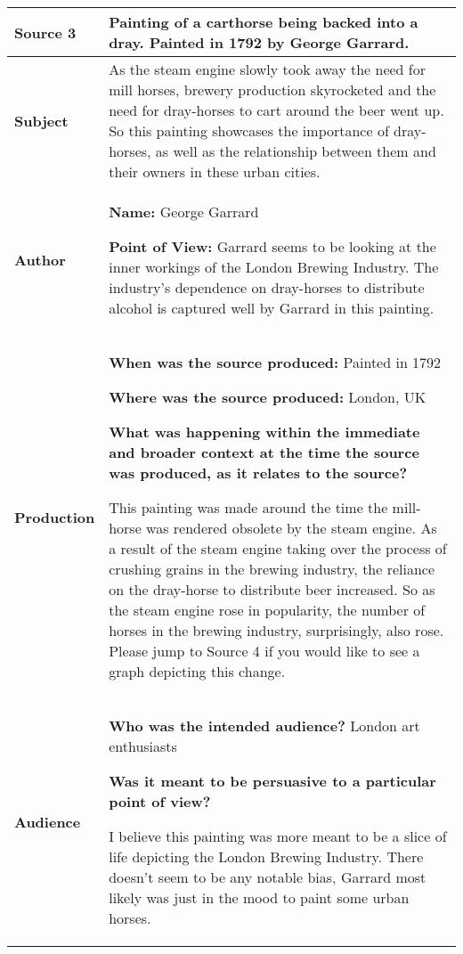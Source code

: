 {\renewcommand{\arraystretch}{2}
\begin{longtable}{ | p{3cm} | p{13cm} | }
\hline

\textbf{Source 3} &
Painting of a carthorse being backed into a dray.  Painted in 1792 by George Garrard.
\\\hline

\textbf{Subject} &
As the steam engine slowly took away the need for mill horses, brewery production skyrocketed and the need for dray-horses to cart around the beer went up.  So this painting showcases the importance of dray-horses, as well as the relationship between them and their owners in these urban cities.
\\\hline

\textbf{Author} &
\textbf{Name:} George Garrard \n

\textbf{Point of View:} Garrard seems to be looking at the inner workings of the London Brewing Industry.  The industry's dependence on dray-horses to distribute alcohol is captured well by Garrard in this painting.
\\\hline

\textbf{Production} &
\textbf{When was the source produced:} Painted in 1792

\textbf{Where was the source produced:} London, UK \n

\textbf{What was happening within the immediate and broader context at the time the source was produced, as it relates to the source? } \n

This painting was made around the time the mill-horse was rendered obsolete by the steam engine.  As a result of the steam engine taking over the process of crushing grains in the brewing industry, the reliance on the dray-horse to distribute beer increased.  So as the steam engine rose in popularity, the number of horses in the brewing industry, surprisingly, also rose.  Please jump to Source 4 if you would like to see a graph depicting this change.
\\\hline

\textbf{Audience} &
\textbf{Who was the intended audience?} London art enthusiasts \n 

\textbf{Was it meant to be persuasive to a particular point of view? } \n

I believe this painting was more meant to be a slice of life depicting the London Brewing Industry.  There doesn't seem to be any notable bias, Garrard most likely was just in the mood to paint some urban horses.
\\\hline
\end{longtable}}